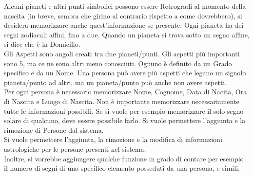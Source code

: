 {  Alcuni pianeti e altri punti simbolici possono essere Retrogradi al momento della nascita (in breve, sembra che girino al contrario rispetto a come dovrebbero), si desidera memorizzare anche quest'informazione se presente.
  Ogni pianeta ha dei segni zodiacali affini, fino a due. Quando un pianeta si trova sotto un segno affine, si dice che è in Domicilio.\\
  Gli Aspetti sono angoli creati tra due pianeti/punti. Gli aspetti più importanti sono 5, ma ce ne sono altri meno conosciuti. Ognuno è definito da un Grado specifico e da un Nome. Una persona può avere più aspetti che legano un signolo pianeta/punto ad altri, ma un pianeta/punto può anche non avere aspetti.\\
  Per ogni persona è necessario memorizzare Nome, Cognome, Data di Nacita, Ora di Nascita e Luogo di Nascita.
  Non è importante memorizzare necessariamente tutte le informazioni possibili. Se si vuole per esempio memorizzare il solo segno solare di qualcuno, deve essere possibile farlo.
  Si vuole permettere l'aggiunta e la rimozione di Persone dal sistema.\\
  Si vuole permettere l'aggiunta, la rimozione e la modifica di informazioni astrologiche per le persone presenti nel sistema.\\
  Inoltre, si vorrebbe aggiungere qualche funzione in grado di contare per esempio il numero di segni di uno specifico elemento posseduti da una persona, e simili.
}
\mline
